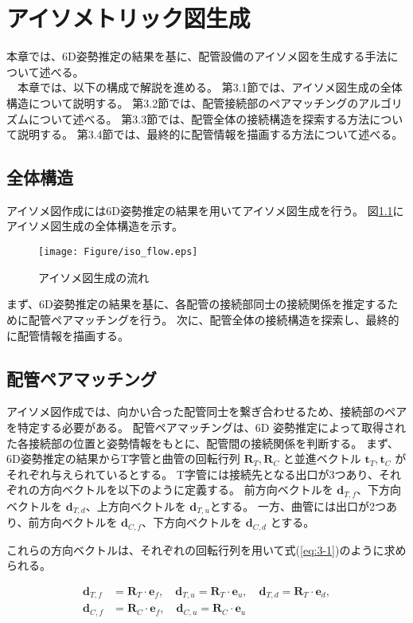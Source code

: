 \chapter{アイソメトリック図生成}
本章では、6D姿勢推定の結果を基に、配管設備のアイソメ図を生成する手法について述べる。\\
　本章では、以下の構成で解説を進める。
第3.1節では、アイソメ図生成の全体構造について説明する。
第3.2節では、配管接続部のペアマッチングのアルゴリズムについて述べる。
第3.3節では、配管全体の接続構造を探索する方法について説明する。
第3.4節では、最終的に配管情報を描画する方法について述べる。

\section{全体構造}
アイソメ図作成には6D姿勢推定の結果を用いてアイソメ図生成を行う。
図\ref{fig:3-f1}にアイソメ図生成の全体構造を示す。
\begin{figure}[htbt]
  \centering
   \texttt{[image: Figure/iso\_flow.eps]}
   \caption{アイソメ図生成の流れ}
   \label{fig:3-f1}
\end{figure}

まず、6D姿勢推定の結果を基に、各配管の接続部同士の接続関係を推定するために配管ペアマッチングを行う。
次に、配管全体の接続構造を探索し、最終的に配管情報を描画する。

\section{配管ペアマッチング}
アイソメ図作成では、向かい合った配管同士を繋ぎ合わせるため、接続部のペアを特定する必要がある。
配管ペアマッチングは、6D 姿勢推定によって取得された各接続部の位置と姿勢情報をもとに、配管間の接続関係を判断する。
まず、6D姿勢推定の結果からT字管と曲管の回転行列 $\mathbf{R}_T, \mathbf{R}_C$ と並進ベクトル $\mathbf{t}_T, \mathbf{t}_C$ がそれぞれ与えられているとする。
T字管には接続先となる出口が3つあり、それぞれの方向ベクトルを以下のように定義する。
前方向ベクトルを $\mathbf{d}_{T,f}$、下方向ベクトルを $\mathbf{d}_{T,d}$、上方向ベクトルを $\mathbf{d}_{T,u}$とする。
一方、曲管には出口が2つあり、前方向ベクトルを $\mathbf{d}_{C,f}$、下方向ベクトルを $\mathbf{d}_{C,d}$ とする。

これらの方向ベクトルは、それぞれの回転行列を用いて式(\ref{eq:3-1})のように求められる。

\begin{equation}
  \begin{aligned}
  \mathbf{d}_{T,f} &= \mathbf{R}_T \cdot \mathbf{e}_f, \quad 
  \mathbf{d}_{T,u} = \mathbf{R}_T \cdot \mathbf{e}_u, \quad 
  \mathbf{d}_{T,d} = \mathbf{R}_T \cdot \mathbf{e}_d, \\
  \mathbf{d}_{C,f} &= \mathbf{R}_C \cdot \mathbf{e}_f, \quad 
  \mathbf{d}_{C,u} = \mathbf{R}_C \cdot \mathbf{e}_u
  \end{aligned}
  \label{eq:3-1}
\end{equation}

